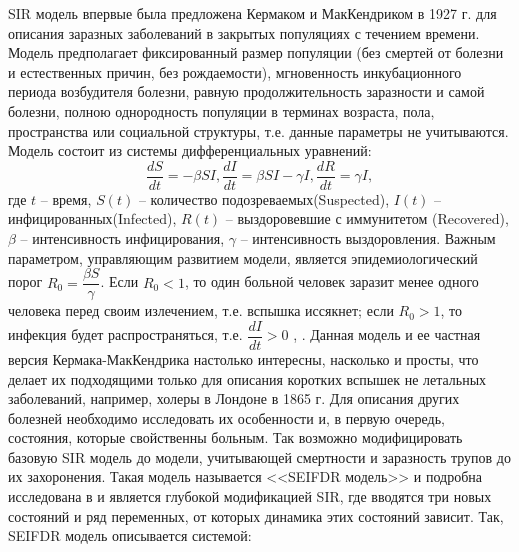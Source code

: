 SIR модель впервые была предложена Кермаком и МакКендриком в 1927 г. для описания заразных заболеваний в закрытых популяциях с течением времени. Модель предполагает фиксированный  размер популяции (без смертей от болезни и естественных причин, без рождаемости), мгновенность инкубационного периода возбудителя болезни, равную продолжительность заразности и самой болезни, полною однородность популяции в терминах возраста, пола, пространства или социальной структуры, т.е. данные параметры не учитываются. Модель состоит из системы  дифференциальных уравнений: \\
\begin{equation} \label{SIR_model:1}
	\dfrac{dS}{dt} =  -\beta SI , 
	\dfrac{dI}{dt} = \beta SI - \gamma I ,
	\dfrac{dR}{dt} = \gamma I , 	
\end{equation}
где $t$ -- время, $S(t)$ -- количество подозреваемых(Suspected), $I(t)$ -- инфицированных(Infected), $R(t)$ -- выздоровевшие с иммунитетом (Recovered), $\beta$ -- интенсивность инфицирования, $ \gamma $ -- интенсивность выздоровления. Важным параметром, управляющим развитием модели, является эпидемиологический порог $R_0 = \dfrac{\beta S}{\gamma} $. Если $R_0 < 1$, то один больной человек заразит  менее одного человека перед своим излечением, т.е. вспышка иссякнет; если $R_0 > 1$, то инфекция будет распространяться, т.е. $\dfrac{dI}{dt} > 0$  %
\cite{Wolfram_MW:SIR} \cite{Anderson_May:1979}, \cite{Kermack_McKendrick:1927}.
Данная модель и ее частная версия Кермака-МакКендрика настолько интересны, насколько и просты, что делает их подходящими только для описания  коротких вспышек не летальных заболеваний, например, холеры в Лондоне в 1865 г. Для описания других болезней необходимо исследовать их особенности и, в первую очередь, состояния, которые свойственны больным. Так возможно  модифицировать базовую SIR модель до модели, учитывающей смертности и заразность трупов до их захоронения. Такая модель называется <<SEIFDR модель>> и подробна исследована  в %
\cite{Bykova:2015} и является глубокой модификацией SIR, где вводятся три новых состояний и ряд переменных, от которых динамика этих состояний зависит. Так, SEIFDR модель описывается системой:
